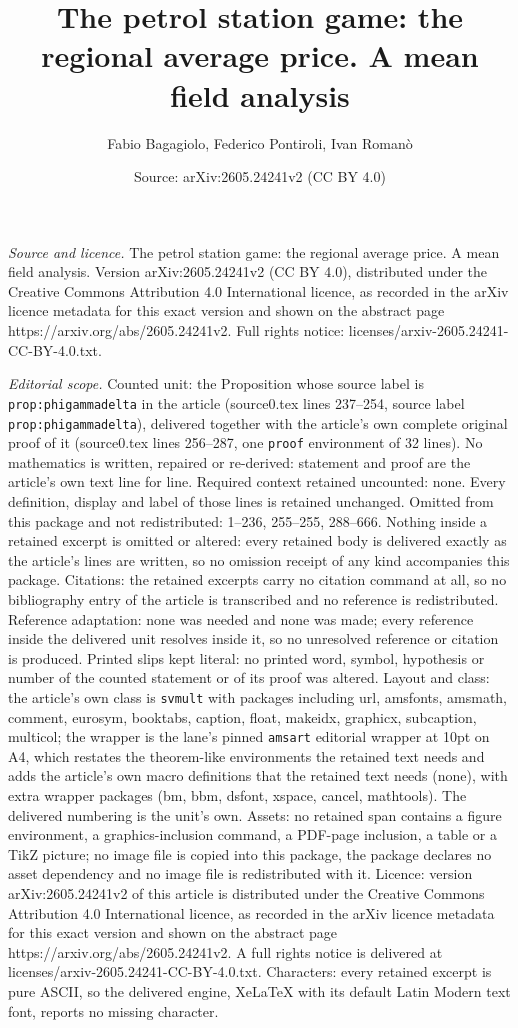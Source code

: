 \documentclass[10pt,a4paper]{amsart}
\title[The petrol station game: the regional average price. A mean ]{The petrol station game: the regional average price. A mean field analysis}
\author{Fabio Bagagiolo, Federico Pontiroli, Ivan Roman\`o}
\date{Source: arXiv:2605.24241v2 (CC BY 4.0)}
\begin{document}
\maketitle

\noindent\emph{Source and licence.} The petrol station game: the regional average price. A mean field analysis. Version arXiv:2605.24241v2 (CC BY 4.0), distributed under the Creative Commons Attribution 4.0 International licence, as recorded in the arXiv licence metadata for this exact version and shown on the abstract page https://arxiv.org/abs/2605.24241v2. Full rights notice: licenses/arxiv-2605.24241-CC-BY-4.0.txt.\par\smallskip

\noindent\textit{Editorial scope.} Counted unit: the Proposition whose source label is \texttt{prop:phigammadelta} in the article (source0.tex lines 237--254, source label \texttt{prop:phigammadelta}), delivered together with the article's own complete original proof of it (source0.tex lines 256--287, one \texttt{proof} environment of 32 lines). No mathematics is written, repaired or re-derived: statement and proof are the article's own text line for line. Required context retained uncounted: none. Every definition, display and label of those lines is retained unchanged. Omitted from this package and not redistributed: 1--236, 255--255, 288--666. Nothing inside a retained excerpt is omitted or altered: every retained body is delivered exactly as the article's lines are written, so no omission receipt of any kind accompanies this package. Citations: the retained excerpts carry no citation command at all, so no bibliography entry of the article is transcribed and no reference is redistributed. Reference adaptation: none was needed and none was made; every reference inside the delivered unit resolves inside it, so no unresolved reference or citation is produced. Printed slips kept literal: no printed word, symbol, hypothesis or number of the counted statement or of its proof was altered. Layout and class: the article's own class is \texttt{svmult} with packages including url, amsfonts, amsmath, comment, eurosym, booktabs, caption, float, makeidx, graphicx, subcaption, multicol; the wrapper is the lane's pinned \texttt{amsart} editorial wrapper at 10pt on A4, which restates the theorem-like environments the retained text needs and adds the article's own macro definitions that the retained text needs (none), with extra wrapper packages (bm, bbm, dsfont, xspace, cancel, mathtools). The delivered numbering is the unit's own. Assets: no retained span contains a figure environment, a graphics-inclusion command, a PDF-page inclusion, a table or a TikZ picture; no image file is copied into this package, the package declares no asset dependency and no image file is redistributed with it. Licence: version arXiv:2605.24241v2 of this article is distributed under the Creative Commons Attribution 4.0 International licence, as recorded in the arXiv licence metadata for this exact version and shown on the abstract page https://arxiv.org/abs/2605.24241v2. A full rights notice is delivered at licenses/arxiv-2605.24241-CC-BY-4.0.txt. Characters: every retained excerpt is pure ASCII, so the delivered engine, XeLaTeX with its default Latin Modern text font, reports no missing character.
\end{document}
